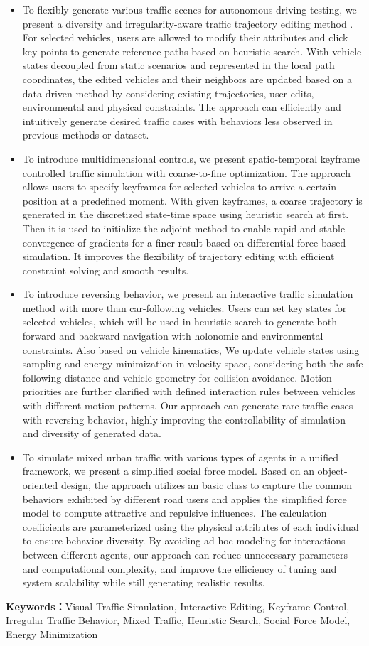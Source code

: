 \begin{itemize}
    \item To flexibly generate various traffic scenes for autonomous driving testing, we present a diversity and irregularity-aware traffic trajectory editing method . For selected vehicles, users are allowed to modify their attributes and click key points to generate reference paths based on heuristic search. With vehicle states decoupled from static scenarios and represented in the local path coordinates, the edited vehicles and their neighbors are updated based on a data-driven method by considering existing trajectories, user edits, environmental and physical constraints. The approach can efficiently and intuitively generate desired traffic cases with behaviors less observed in previous methods or dataset.

    \item To introduce multidimensional controls, we present spatio-temporal keyframe controlled traffic simulation with coarse-to-fine optimization. The approach allows users to specify keyframes for selected vehicles to arrive a certain position at a predefined moment. With given keyframes, a coarse trajectory is generated in the discretized state-time space using heuristic search at first. Then it is used to initialize the adjoint method to enable rapid and stable convergence of gradients for a finer result based on differential force-based simulation. It improves the flexibility of trajectory editing with efficient constraint solving and smooth results.

    \item To introduce reversing behavior, we present an interactive traffic simulation method with more than car-following vehicles. Users can set key states for selected vehicles, which will be used in heuristic search to generate both forward and backward navigation with holonomic and environmental constraints. Also based on vehicle kinematics, We update vehicle states using sampling and energy minimization in velocity space, considering both the safe following distance and vehicle geometry for collision avoidance. Motion priorities are further clarified with defined interaction rules between vehicles with different motion patterns. Our approach can generate rare traffic cases with reversing behavior, highly improving the controllability of simulation and diversity of generated data. 

    \item To simulate mixed urban traffic with various types of agents in a unified framework, we present a simplified social force model. Based on an object-oriented design, the approach utilizes an basic class to capture the common behaviors exhibited by different road users and applies the simplified force model to compute attractive and repulsive influences. The calculation coefficients are parameterized using the physical attributes of each individual to ensure behavior diversity. By avoiding ad-hoc modeling for interactions between different agents, our approach can reduce unnecessary parameters and computational complexity, and improve the efficiency of tuning and system scalability while still generating realistic results. 
    

\end{itemize}

\noindent\textbf{Keywords：}Visual Traffic Simulation, Interactive Editing, Keyframe Control, Irregular Traffic Behavior, Mixed Traffic, Heuristic Search, Social Force Model, Energy Minimization
